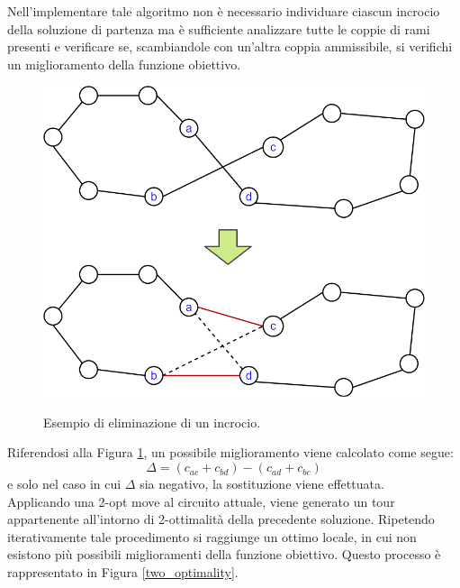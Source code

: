 Nell'implementare tale algoritmo non è necessario individuare ciascun incrocio della soluzione di partenza ma è sufficiente analizzare tutte le coppie di rami presenti e verificare se, scambiandole con un'altra coppia ammissibile, si verifichi un miglioramento della funzione obiettivo.
\begin{figure}[H] 
\begin{center} 
  \includegraphics[scale=0.35]{Images/swap}\\ 
  \caption{\footnotesize{Esempio di eliminazione di un incrocio.}}
  \label{swap}
\end{center}
\end{figure}
Riferendosi alla Figura \ref{swap}, un possibile miglioramento viene calcolato come segue:\\
$$\Delta = (c_{ac} + c_{bd}) - (c_{ad} + c_{bc})$$
e solo nel caso in cui $\Delta$ sia negativo, la sostituzione viene effettuata.\\
Applicando una 2-opt move al circuito attuale, viene generato un tour appartenente all'intorno di 2-ottimalità della precedente soluzione. Ripetendo iterativamente tale procedimento si raggiunge un ottimo locale, in cui non esistono più possibili miglioramenti della funzione obiettivo. Questo processo è rappresentato in Figura \ref{two_optimality}. 
